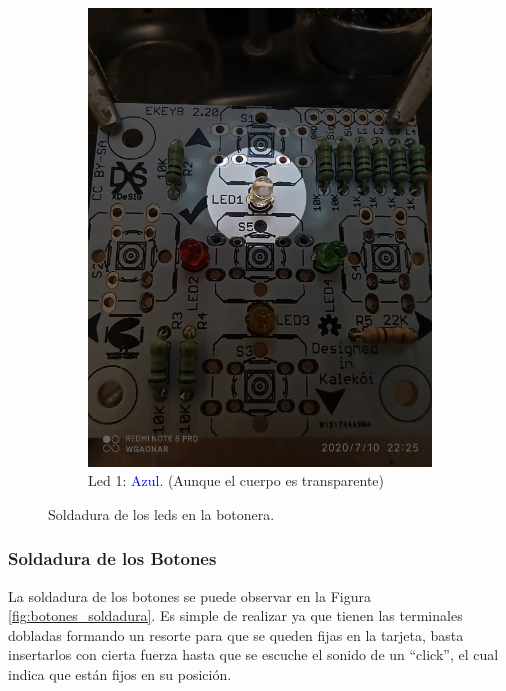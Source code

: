 \documentclass{article}
\begin{document}
\begin{figure}[H]
\begin{subfigure}[t]{0.3\textwidth}
        \includegraphics[width=0.9\columnwidth, height=1.2\columnwidth]{images/Botonera/led3.jpg}
        \caption{Led 1: \textcolor{blue}{Azul}. (Aunque el cuerpo es transparente)}
        \label{fig:botonera_led3}
    \end{subfigure}
    
    \caption{Soldadura de los leds en la botonera.}
    \label{fig:botonera_leds}
\end{figure}

\subsubsection{Soldadura de los Botones}
La soldadura de los botones se puede observar en la Figura \ref{fig:botones_soldadura}. Es simple de realizar ya que tienen las terminales dobladas formando un resorte para que se queden fijas en la tarjeta, basta insertarlos con cierta fuerza hasta que se escuche el sonido de un “click”, el cual indica que están fijos en su posición. 
\end{document}
